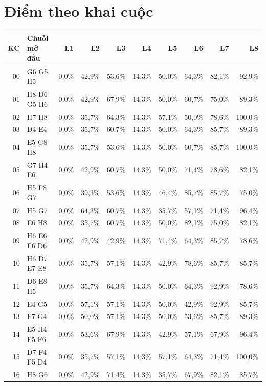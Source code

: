 \section{Điểm theo khai cuộc}
\begin{small}\scriptsize
\begin{longtable}{@{}rlrrrrrrrr@{}}
\toprule
KC & Chuỗi mở đầu & L1 & L2 & L3 & L4 & L5 & L6 & L7 & L8 \\
\midrule
00 & G6 G5 H5 & 0,0\% & 42,9\% & 53,6\% & 14,3\% & 50,0\% & 64,3\% & 82,1\% & 92,9\% \\
01 & H8 D6 G5 H6 & 0,0\% & 42,9\% & 67,9\% & 14,3\% & 50,0\% & 60,7\% & 75,0\% & 89,3\% \\
02 & H7 H8 & 0,0\% & 35,7\% & 64,3\% & 14,3\% & 57,1\% & 50,0\% & 78,6\% & 100,0\% \\
03 & D4 E4 & 0,0\% & 35,7\% & 60,7\% & 14,3\% & 50,0\% & 64,3\% & 85,7\% & 89,3\% \\
04 & E5 G8 H8 & 0,0\% & 35,7\% & 53,6\% & 14,3\% & 50,0\% & 60,7\% & 85,7\% & 100,0\% \\
05 & G7 H4 E6 & 0,0\% & 42,9\% & 60,7\% & 14,3\% & 50,0\% & 71,4\% & 78,6\% & 82,1\% \\
06 & H5 F8 G7 & 0,0\% & 39,3\% & 53,6\% & 14,3\% & 46,4\% & 85,7\% & 85,7\% & 75,0\% \\
07 & H5 G7 & 0,0\% & 64,3\% & 60,7\% & 14,3\% & 35,7\% & 57,1\% & 71,4\% & 96,4\% \\
08 & E6 H8 & 0,0\% & 35,7\% & 60,7\% & 14,3\% & 50,0\% & 82,1\% & 75,0\% & 82,1\% \\
09 & H6 E6 F6 D6 & 0,0\% & 42,9\% & 42,9\% & 14,3\% & 71,4\% & 64,3\% & 85,7\% & 78,6\% \\
10 & H6 D7 E7 E8 & 0,0\% & 35,7\% & 57,1\% & 14,3\% & 42,9\% & 78,6\% & 85,7\% & 85,7\% \\
11 & D6 E8 H5 & 0,0\% & 35,7\% & 64,3\% & 14,3\% & 50,0\% & 64,3\% & 92,9\% & 78,6\% \\
12 & E4 G5 & 0,0\% & 57,1\% & 57,1\% & 14,3\% & 50,0\% & 42,9\% & 92,9\% & 85,7\% \\
13 & F7 G4 & 0,0\% & 50,0\% & 57,1\% & 14,3\% & 50,0\% & 53,6\% & 85,7\% & 89,3\% \\
14 & E5 H4 F5 F6 & 0,0\% & 53,6\% & 67,9\% & 14,3\% & 42,9\% & 57,1\% & 67,9\% & 96,4\% \\
15 & D7 F4 F5 D4 & 0,0\% & 35,7\% & 57,1\% & 14,3\% & 57,1\% & 64,3\% & 71,4\% & 100,0\% \\
16 & H8 G6 & 0,0\% & 42,9\% & 71,4\% & 14,3\% & 35,7\% & 67,9\% & 82,1\% & 85,7\% \\

\end{longtable}
\end{small}
